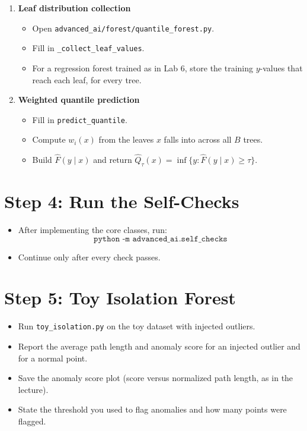 \begin{enumerate}[label=\textbf{T\arabic*.}]
  \item \textbf{Leaf distribution collection}
\begin{itemize}
  \item Open \texttt{advanced\_ai/forest/quantile\_forest.py}.
  \item Fill in \texttt{\_collect\_leaf\_values}.
  \item For a regression forest trained as in Lab 6, store the training $y$-values that reach each leaf, for every tree.
\end{itemize}

  \item \textbf{Weighted quantile prediction}
\begin{itemize}
  \item Fill in \texttt{predict\_quantile}.
  \item Compute $w_i(x)$ from the leaves $x$ falls into across all $B$ trees.
  \item Build $\hat{F}(y\mid x)$ and return $\hat{Q}_\tau(x) = \inf\{y : \hat{F}(y\mid x) \ge \tau\}$.
\end{itemize}
\end{enumerate}

\section*{Step 4: Run the Self-Checks}
\begin{itemize}
  \item After implementing the core classes, run:
  \[
    \texttt{python -m advanced\_ai.self\_checks}
  \]
  \item Continue only after every check passes.
\end{itemize}

\section*{Step 5: Toy Isolation Forest}
\begin{itemize}
  \item Run \texttt{toy\_isolation.py} on the toy dataset with injected outliers.
  \item Report the average path length and anomaly score for an injected outlier and for a normal point.
  \item Save the anomaly score plot (score versus normalized path length, as in the lecture).
  \item State the threshold you used to flag anomalies and how many points were flagged.
\end{itemize}

